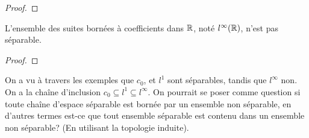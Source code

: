 \ifdefined\outputproof
\begin{proof}

\end{proof}
\fi

\begin{proposition}
	L'ensemble des suites bornées à coefficients dans $\mathbb{R}$, noté
	$l^{\infty}(\mathbb{R})$, n'est pas séparable.
\end{proposition}

\ifdefined\outputproof
\begin{proof}

\end{proof}
\fi

\begin{question}
	On a vu à travers les exemples que $c_{0}$, et $l^{1}$ sont séparables,
	tandis que $l^{\infty}$ non. On a la chaîne d'inclusion $c_{0} \subseteq
	l^{1} \subseteq l^{\infty}$.
	On pourrait se poser comme question si toute chaîne d'espace séparable
	est bornée par un ensemble non séparable, en d'autres termes est-ce que tout
	ensemble séparable est contenu dans un ensemble non séparable? (En
	utilisant la topologie induite).
\end{question}
